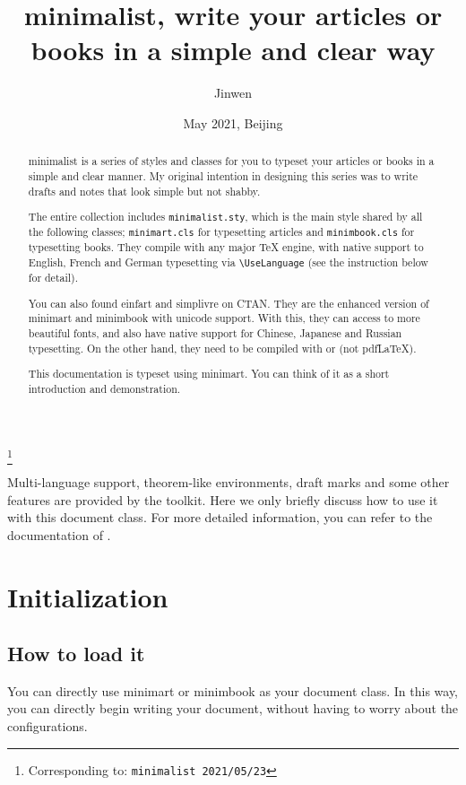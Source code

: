 \documentclass{minimart}
\newenvironment{remind}[1][Remind]{%
    \LocallyStopLineNumbers%
    \begin{tcolorbox}[breakable,
        enhanced,
        width = \textwidth,
        colback = white, colbacktitle = paper,
        colframe = gray!50, boxrule=0.2mm,
        coltitle = black,
        fonttitle = \sffamily,
        attach boxed title to top left = {yshift=-\tcboxedtitleheight/2,  xshift=\tcboxedtitlewidth/4},
        boxed title style = {boxrule=0pt, colframe=paper},
        before skip = 0.3cm,
        after skip = 0.3cm,
        top = 3mm,
        bottom = 3mm,
        title={\sffamily #1}]%
}{\end{tcolorbox}\ResumeLineNumbers}
\providecommand{\minimalist}{\textsf{minimalist}}
\providecommand{\minimart}{\textsf{minimart}}
\providecommand{\minimbook}{\textsf{minimbook}}
\providecommand{\einfart}{\textsf{einfart}}
\providecommand{\simplivre}{\textsf{simplivre}}
\begin{document}
\title{\minimalist{}, write your articles or books in a simple and clear way}
\author{Jinwen}
\thanks{Corresponding to: \texttt{\minimalist{} 2021/05/23}}
\date{May 2021, Beijing}

\maketitle

\begin{abstract}
    \minimalist{} is a series of styles and classes for you to typeset your articles or books in a simple and clear manner. My original intention in designing this series was to write drafts and notes that look simple but not shabby.
    
    The entire collection includes \verb|minimalist.sty|, which is the main style shared by all the following classes; \verb|minimart.cls| for typesetting articles and \verb|minimbook.cls| for typesetting books. They compile with any major \TeX{} engine, with native support to English, French and German typesetting via \lstinline|\UseLanguage| (see the instruction below for detail).

    You can also found \einfart{} and \simplivre{} on CTAN. They are the enhanced version of \minimart{} and \minimbook{} with unicode support. With this, they can access to more beautiful fonts, and also have native support for Chinese, Japanese and Russian typesetting. On the other hand, they need to be compiled with  or  (not pdf\LaTeX).
    
    This documentation is typeset using \minimart{}. You can think of it as a short introduction and demonstration.
\end{abstract}

\tableofcontents


\bigskip
\begin{remind}
    Multi-language support, theorem-like environments, draft marks and some other features are provided by the \ProjLib{} toolkit. Here we only briefly discuss how to use it with this document class. For more detailed information, you can refer to the documentation of \ProjLib{}.
\end{remind}

\clearpage
\section{Initialization}

\subsection{How to load it}
You can directly use \minimart{} or \minimbook{} as your document class. In this way, you can directly begin writing your document, without having to worry about the configurations.
\end{document}
